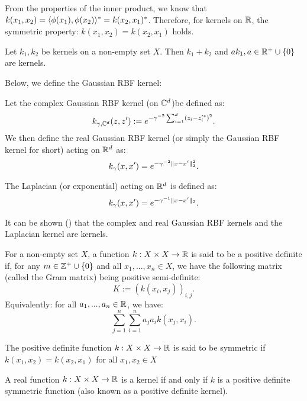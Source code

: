 \documentclass[twoside]{memoir}
\begin{document}
	From the properties of the inner product, we know that $k(x_1, x_2) = \langle\phi(x_1), \phi(x_2)\rangle^* = k(x_2, x_1)^*$. Therefore, for kernels on $\mathbb{R}$, the symmetric property: $k(x_1, x_2) = k(x_2, x_1)$ holds.
	\begin{lem}
		Let $k_1, k_2$ be kernels on a non-empty set $X$. Then $k_1 + k_2$ and $ak_1, a \in \mathbb{R}^+ \cup \{0\}$ are kernels. 
	\end{lem}
	Below, we define the Gaussian RBF kernel:
	\begin{defn}
		Let the complex Gaussian RBF kernel (on $\mathbb{C}^d$)be defined as:
		\[ k_{\gamma, \mathbb{C}^d}(z, z') := e^{-\gamma^{-2} \sum_{i=1}^{d} (z_i - z_i'^*)^2 } .\]
		We then define the real Gaussian RBF kernel (or simply the Gaussian RBF kernel for short) acting on $\mathbb{R}^d$ as:
		\[ k_\gamma(x, x') = e^{- \gamma^{-2} \lVert x - x'\rVert_2^2}. \]
	\end{defn}
	\begin{defn}
	The Laplacian (or exponential) acting on $\mathbb{R}^d$ is defined as:
	\[ k_\gamma(x, x') = e^{- \gamma^{-1} \lVert x - x'\rVert_2}. \]	
	\end{defn}
	It can be shown (\cite{steinwartSVM}) that the complex and real Gaussian RBF kernels and the Laplacian kernel are kernels.
	\begin{defn}
		For a non-empty set $X$, a function $k: X \times X \rightarrow \mathbb{R}$ is said to be a positive definite if, for any $m \in \mathbb{Z}^+ \cup \{0\}$ and all $x_1, ..., x_n \in X$, we have the following matrix (called the Gram matrix) being positive semi-definite:
		\[ K := (k(x_i, x_j))_{i,j}. \]
		Equivalently: for all $a_1, ..., a_n \in \mathbb{R}$, we have:
		\[ \sum_{j=1}^{n} \sum_{i=1}^{n} a_j a_i k(x_j, x_i). \]
	\end{defn}
	\begin{defn}
		The positive definite function $k: X \times X \rightarrow \mathbb{R}$ is said to be symmetric if  $k(x_1, x_2) = k(x_2, x_1)$ for all $x_1, x_2 \in X$
	\end{defn}
	\begin{thm}
		A real function $k:X \times X \rightarrow \mathbb{R}$ is a kernel if and only if $k$ is a positive definite symmetric function (also known as a positive definite kernel).
	\end{thm}
\end{document}
